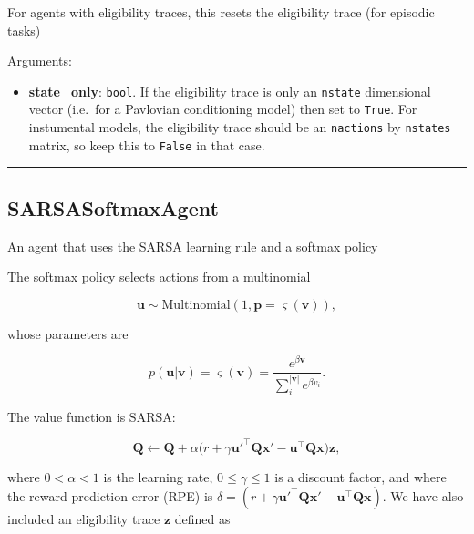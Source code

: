 For agents with eligibility traces, this resets the eligibility trace
(for episodic tasks)

Arguments:

\begin{itemize}
\tightlist
\item
  \textbf{state\_only}: \texttt{bool}. If the eligibility trace is only
  an \texttt{nstate} dimensional vector (i.e.~for a Pavlovian
  conditioning model) then set to \texttt{True}. For instumental models,
  the eligibility trace should be an \texttt{nactions} by
  \texttt{nstates} matrix, so keep this to \texttt{False} in that case.
\end{itemize}

\begin{center}\rule{0.5\linewidth}{\linethickness}\end{center}

\subsection{SARSASoftmaxAgent}\label{sarsasoftmaxagent}

\begin{Shaded}
\begin{Highlighting}[]
\end{Highlighting}
\end{Shaded}

An agent that uses the SARSA learning rule and a softmax policy

The softmax policy selects actions from a multinomial

\[
\mathbf u \sim \mathrm{Multinomial}(1, \mathbf p=\varsigma(\mathbf v)),
\]

whose parameters are

\[
p(\mathbf u|\mathbf v) = \varsigma(\mathbf v) = \frac{e^{\beta \mathbf v}}{\sum_{i}^{|\mathbf v|} e^{\beta v_i}}.
\]

The value function is SARSA:

\[
\mathbf Q \gets \mathbf Q + \alpha \big(r + \gamma \mathbf u'^\top \mathbf Q \mathbf x' - \mathbf u^\top \mathbf Q \mathbf x \big) \mathbf z,
\]

where \(0 < \alpha < 1\) is the learning rate, \(0 \leq \gamma \leq 1\)
is a discount factor, and where the reward prediction error (RPE) is
\(\delta = (r + \gamma \mathbf u'^\top \mathbf Q \mathbf x' - \mathbf u^\top \mathbf Q \mathbf x)\).
We have also included an eligibility trace \(\mathbf z\) defined as

